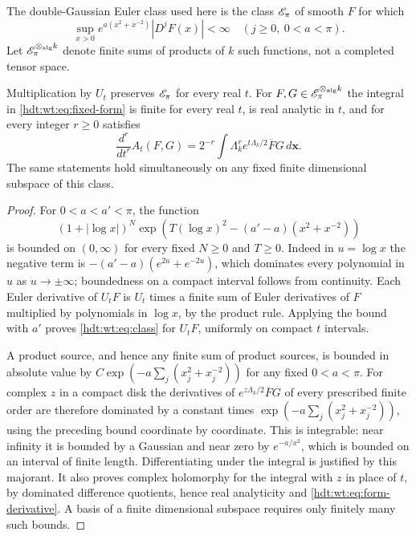 \documentclass[11pt]{article}
\begin{document}
The double-Gaussian Euler class used here is the class $\mathscr E_\pi$
of smooth $F$ for which
\begin{equation}\label{hdt:wt:eq:class}
 \sup_{x>0}e^{a(x^2+x^{-2})}|D^jF(x)|<\infty
 \quad(j\geq0,\ 0<a<\pi).
\end{equation}
Let $\mathscr E_\pi^{\otimes_{\mathrm{alg}} k}$ denote finite sums of
products of $k$ such functions, not a completed tensor space.

\begin{hdtlemma}
\label{hdt:wt:lem:domination}
Multiplication by $U_t$ preserves $\mathscr E_\pi$ for every real $t$.
For $F,G\in\mathscr E_\pi^{\otimes_{\mathrm{alg}} k}$ the integral
in \eqref{hdt:wt:eq:fixed-form} is finite for every real $t$, is
real analytic in $t$, and for every integer $r\geq0$ satisfies
\begin{equation}\label{hdt:wt:eq:form-derivative}
 \frac{d^r}{dt^r}A_t(F,G)
 =2^{-r}\int\Lambda_k^r e^{t\Lambda_k/2}\overline F G\,d\mathbf x.
\end{equation}
The same statements hold simultaneously on any fixed finite
dimensional subspace of this class.
\end{hdtlemma}

\begin{proof}
For $0<a<a'<\pi$, the function
\[
 (1+|\log x|)^N
 \exp\!\left(T(\log x)^2-(a'-a)(x^2+x^{-2})\right)
\]
is bounded on $(0,\infty)$ for every fixed $N\geq0$ and $T\geq0$.
Indeed in $u=\log x$ the negative term is
$-(a'-a)(e^{2u}+e^{-2u})$, which dominates every polynomial
in $u$ as $u\to\pm\infty$; boundedness on a compact interval
follows from continuity.  Each Euler derivative of $U_tF$ is
$U_t$ times a finite sum of Euler derivatives of $F$ multiplied
by polynomials in $\log x$, by the product rule.  Applying the
bound with $a'$ proves \eqref{hdt:wt:eq:class} for $U_tF$, uniformly
on compact $t$ intervals.

A product source, and hence any finite sum of product sources,
is bounded in absolute value by
$C\exp(-a\sum_j(x_j^2+x_j^{-2}))$ for any fixed $0<a<\pi$.
For complex $z$ in a compact disk the derivatives of
$e^{z\Lambda_k/2}\overline F G$ of every prescribed finite
order are therefore dominated by a constant times
$\exp(-a\sum_j(x_j^2+x_j^{-2}))$, using the preceding bound
coordinate by coordinate.  This is integrable: near infinity
it is bounded by a Gaussian and near zero by $e^{-a/x^2}$,
which is bounded on an interval of finite length.  Differentiating
under the integral is justified by this majorant.  It also proves
complex holomorphy for the integral with $z$ in place of $t$,
by dominated difference quotients, hence real analyticity and
\eqref{hdt:wt:eq:form-derivative}.  A basis of a finite dimensional
subspace requires only finitely many such bounds.
\end{proof}
\end{document}
